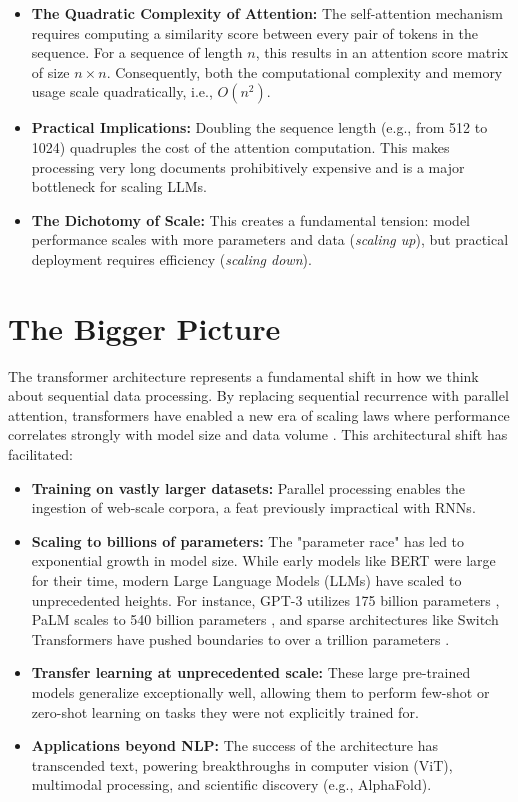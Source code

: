 \begin{itemize}
    \item \textbf{The Quadratic Complexity of Attention:} The self-attention mechanism requires computing a similarity score between every pair of tokens in the sequence. For a sequence of length $n$, this results in an attention score matrix of size $n \times n$. Consequently, both the computational complexity and memory usage scale quadratically, i.e., $O(n^2)$.
    \item \textbf{Practical Implications:} Doubling the sequence length (e.g., from 512 to 1024) quadruples the cost of the attention computation. This makes processing very long documents prohibitively expensive and is a major bottleneck for scaling LLMs.
    \item \textbf{The Dichotomy of Scale:} This creates a fundamental tension: model performance scales with more parameters and data (\textit{scaling up}), but practical deployment requires efficiency (\textit{scaling down}).
\end{itemize}


\section{The Bigger Picture}

The transformer architecture represents a fundamental shift in how we think about sequential data processing. By replacing sequential recurrence with parallel attention, transformers have enabled a new era of scaling laws where performance correlates strongly with model size and data volume \cite{kaplan2020scaling}. This architectural shift has facilitated:

\begin{itemize}
    \item \textbf{Training on vastly larger datasets:} Parallel processing enables the ingestion of web-scale corpora, a feat previously impractical with RNNs.
    \item \textbf{Scaling to billions of parameters:} The "parameter race" has led to exponential growth in model size. While early models like BERT were large for their time, modern Large Language Models (LLMs) have scaled to unprecedented heights. For instance, GPT-3 utilizes 175 billion parameters \cite{brown2020language}, PaLM scales to 540 billion parameters \cite{chowdhery2022palm}, and sparse architectures like Switch Transformers have pushed boundaries to over a trillion parameters \cite{fedus2022switch}.
    \item \textbf{Transfer learning at unprecedented scale:} These large pre-trained models generalize exceptionally well, allowing them to perform few-shot or zero-shot learning on tasks they were not explicitly trained for.
    \item \textbf{Applications beyond NLP:} The success of the architecture has transcended text, powering breakthroughs in computer vision (ViT), multimodal processing, and scientific discovery (e.g., AlphaFold).
\end{itemize}

